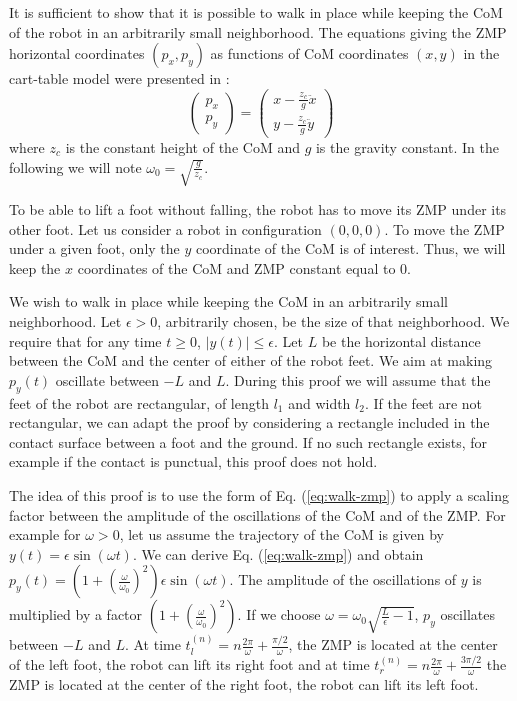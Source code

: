 \documentclass{article}
\begin{document}
It is sufficient to show that it  is possible to walk in place while keeping
the  CoM of  the  robot  in an  arbitrarily  small neighborhood.  The
equations  giving  the   ZMP  horizontal  coordinates  $(p_x,p_y)$  as
functions  of CoM  coordinates $(x,y)$  in the  cart-table  model were
presented in \cite{kajita2003biped}:
\begin{equation}
\label{eq:walk-zmp}
\left(
\begin{array}{c}
p_x\\ p_y
\end{array}
\right) = \displaystyle \left(
\begin{array}{c}
x - \frac{z_c}{g} \ddot{x}\\ y - \frac{z_c}{g} \ddot{y}
\end{array}
\right)
\end{equation}
where $z_c$ is  the constant height of the CoM and  $g$ is the gravity
constant.    In    the    following    we    will    note    $\omega_0
=\sqrt{\frac{g}{z_c}}$.

To be able to  lift a foot without falling, the robot  has to move its
ZMP under its other foot. Let  us consider a robot in configuration
$(0,0,0)$. To move the ZMP  under a
given foot, only  the $y$ coordinate of the CoM  is of interest. Thus,
we will keep the $x$ coordinates  of the CoM and ZMP constant equal to
$0$.

We wish to walk in place while keeping the CoM in an arbitrarily small
neighborhood. Let $\epsilon >0$, arbitrarily chosen, be the size of
that neighborhood. We 
require that for  any time $t\geq 0$, $|y(t)|  \leq \epsilon$. Let $L$
be the horizontal distance between the CoM and the center of either of
the robot feet. We aim at
making $p_y(t)$ oscillate  between $-L$ and $L$. During  this proof we
will  assume that the  feet of  the robot  are rectangular,  of length
$l_1$ and width  $l_2$. If the feet are not  rectangular, we can adapt
the proof by  considering a rectangle included in  the contact surface
between  a foot  and  the ground.  If  no such  rectangle exists,  for
example if the contact is punctual, this proof does not hold.

The idea of this proof is to use the form of Eq. (\ref{eq:walk-zmp}) to
apply a  scaling factor between  the amplitude of the  oscillations of
the CoM and of the ZMP. For example for $\omega >0$, let us assume the
trajectory of the CoM is given by $y(t) = \epsilon \sin(\omega t)$. We
can derive Eq. (\ref{eq:walk-zmp}) and obtain $p_y(t) =
(1+\left(\frac{\omega}{\omega_0}\right)^2)\epsilon\sin(\omega t)$. The
amplitude  of  the oscillations  of  $y$  is  multiplied by  a  factor
$(1+\left(\frac{\omega}{\omega_0}\right)^2)$.  If we choose  $\omega =
\omega_0 \sqrt{\frac{L}{\epsilon} -1}$,  $p_y$ oscillates between $-L$
and    $L$.   At    time   $t_l^{(n)}    =    n\frac{2\pi}{\omega}   +
\frac{\pi/2}{\omega}$, the  ZMP is located  at the center of  the left
foot,  the robot  can lift  its right  foot and  at time  $t_r^{(n)} =
n\frac{2\pi}{\omega}  + \frac{3\pi/2}{\omega}$ the  ZMP is  located at
the center of the right foot, the robot can lift its left foot.
\end{document}
